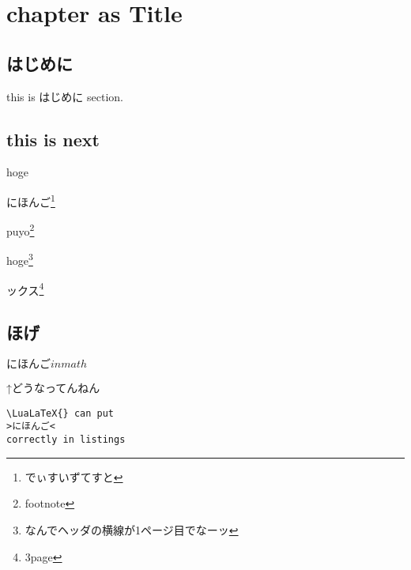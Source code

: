 \documentclass{word}
\author{WORD太郎}
\subtitle{subtitleだぴょん}
\begin{document}
\chapter{chapter as Title}

\section{はじめに}
this is はじめに section.

\section{this is next}

hoge

にほんご\footnote{でぃすいずてすと}

puyo\footnote{footnote}

hoge\footnote{なんでヘッダの横線が1ページ目でなーッ}

ックス\footnote{3page}

\newpage

\section{ほげ}

\newpage

$にほんごinmath$

\newpage
↑どうなってんねん

\lstset{language=TeX,numbers=left}
\begin{lstlisting}
\LuaLaTeX{} can put
>にほんご<
correctly in listings
\end{lstlisting}
\end{document}
